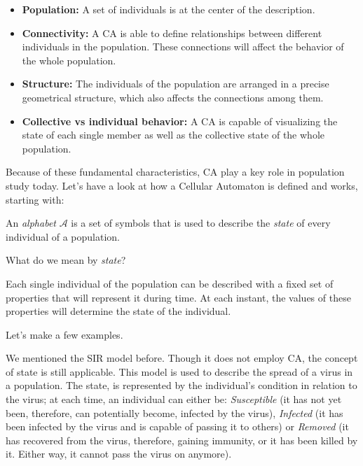\begin{itemize}
\item \textbf{Population:} A set of individuals is at the center of the description.
\item \textbf{Connectivity:} A CA is able to define relationships between different individuals in
the population. These connections will affect the behavior of the whole population.
\item \textbf{Structure:} The individuals of the population are arranged in a precise geometrical structure,
which also affects the connections among them.
\item \textbf{Collective vs individual behavior:} A CA is capable of visualizing the state of each single
member as well as the collective state of the whole population.
\end{itemize}

Because of these fundamental characteristics, CA play a key role in population study today. Let's have
a look at how a Cellular Automaton is defined and works, starting with:

\begin{definition}[Alphabet]
\label{def:alpha}
An \textit{alphabet} $\mathcal{A}$ is a set of symbols that is used to describe
the \textit{state} of every individual of a population.
\end{definition}

What do we mean by \textit{state}? 

\begin{definition}[State]
\label{def:state}
Each single individual of the population can be described with a fixed set of properties that will represent
it during time. At each instant, the values of these properties will determine the state of the individual.
\end{definition}

Let's make a few examples.

\begin{example}
\label{ex:statesir}
We mentioned the SIR model before. Though it does not employ CA, the concept of state is still applicable.
This model is used to describe the spread of a virus in a population.
The state, is represented by the individual's condition in relation
to the virus; at each time, an individual can either be:
\textit{Susceptible} (it has not yet been, therefore, can potentially become, infected by the virus),
\textit{Infected} (it has been infected by the virus and is capable of passing it to others) or
\textit{Removed} (it has recovered from the virus, therefore, gaining immunity,
or it has been killed by it. Either way,
it cannot pass the virus on anymore).
\end{example}

